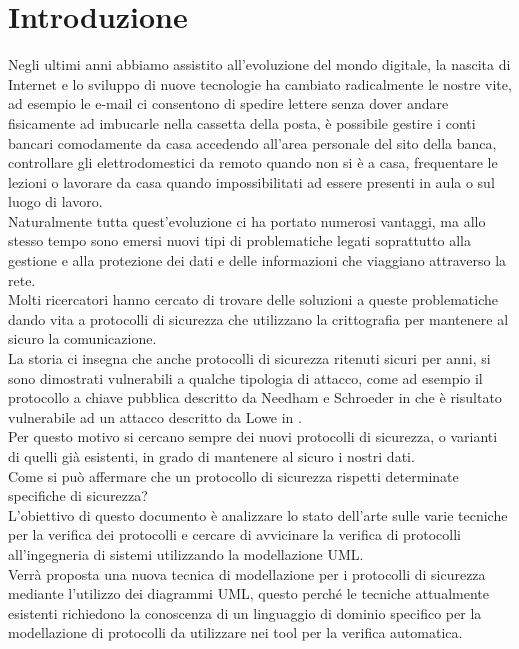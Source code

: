 \section{Introduzione}

Negli ultimi anni abbiamo assistito all'evoluzione del mondo digitale, la nascita di Internet e lo sviluppo di nuove tecnologie ha cambiato radicalmente le nostre vite, ad esempio le e-mail ci consentono di spedire lettere senza dover andare fisicamente ad imbucarle nella cassetta della posta, è possibile gestire i conti bancari comodamente da casa accedendo all'area personale del sito della banca, controllare gli elettrodomestici da remoto quando non si è a casa, frequentare le lezioni o lavorare da casa quando impossibilitati ad essere presenti in aula o sul luogo di lavoro.\\
Naturalmente tutta quest'evoluzione ci ha portato numerosi vantaggi, ma allo stesso tempo sono emersi nuovi tipi di problematiche legati soprattutto alla gestione e alla protezione dei dati e delle informazioni che viaggiano attraverso la rete.\\
Molti ricercatori hanno cercato di trovare delle soluzioni a queste problematiche dando vita a protocolli di sicurezza che utilizzano la crittografia per mantenere al sicuro la comunicazione.\\
La storia ci insegna che anche protocolli di sicurezza ritenuti sicuri per anni, si sono dimostrati vulnerabili a qualche tipologia di attacco, come ad esempio il protocollo a chiave pubblica descritto da Needham e Schroeder in \cite{NS78} che è risultato vulnerabile ad un attacco descritto da Lowe in \cite{L95}.\\
Per questo motivo si cercano sempre dei nuovi protocolli di sicurezza, o varianti di quelli già esistenti, in grado di mantenere al sicuro i nostri dati.\\
Come si può affermare che un protocollo di sicurezza rispetti determinate specifiche di sicurezza?\\
L'obiettivo di questo documento è analizzare lo stato dell'arte sulle varie tecniche per la verifica dei protocolli e cercare di avvicinare la verifica di protocolli all’ingegneria di sistemi utilizzando la modellazione UML.\\ 
Verrà proposta una nuova tecnica di modellazione per i protocolli di sicurezza mediante l'utilizzo dei diagrammi UML, questo perch\'e le tecniche attualmente esistenti richiedono la conoscenza di un linguaggio di dominio specifico per la modellazione di protocolli da utilizzare nei tool per la verifica automatica.\\
